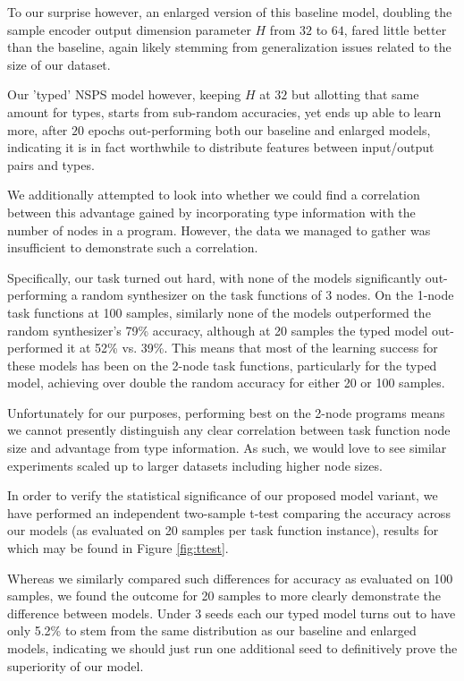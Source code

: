 \documentclass{article}
\begin{document}
To our surprise however, an enlarged version of this baseline model,
doubling the sample encoder output dimension parameter $H$ from $32$ to $64$,
fared little better than the baseline, again likely stemming
from generalization issues related to the size of our dataset.

Our 'typed' NSPS model however,
keeping $H$ at $32$ but allotting that same amount for types,
starts from sub-random accuracies, yet ends up able to learn more,
after $20$ epochs out-performing both our baseline and enlarged models,
indicating it is in fact worthwhile to distribute features between input/output pairs and types.

We additionally attempted to look into whether we could find a correlation between this
advantage gained by incorporating type information with the number of nodes in a program.
However, the data we managed to gather was insufficient to demonstrate such a correlation.


Specifically, our task turned out hard,
with none of the models significantly out-performing a random synthesizer
on the task functions of 3 nodes.
On the 1-node task functions at 100 samples,
similarly none of the models outperformed the random synthesizer's 79\% accuracy,
although at 20 samples the typed model out-performed it at 52\% vs. 39\%.
This means that most of the learning success for these models has been on the 2-node task functions,
particularly for the typed model, achieving over double the random accuracy for either 20 or 100 samples.

Unfortunately for our purposes, performing best on the 2-node programs
means we cannot presently distinguish any clear correlation between
task function node size and advantage from type information.
As such, we would love to see similar experiments scaled up to larger datasets including higher node sizes.

In order to verify the statistical significance of our proposed model variant,
we have performed an independent two-sample t-test comparing the accuracy across our models
(as evaluated on 20 samples per task function instance),
results for which may be found in Figure \ref{fig:ttest}.

Whereas we similarly compared such differences for accuracy as evaluated on 100 samples,
we found the outcome for 20 samples to more clearly demonstrate the difference between models.
Under 3 seeds each our typed model turns out to have only 5.2\%
to stem from the same distribution as our baseline and enlarged models,
indicating we should just run one additional seed to definitively prove the superiority of our model.
\end{document}
